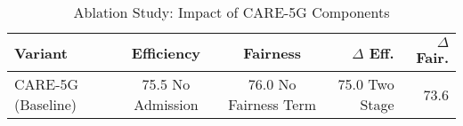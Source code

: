 \begin{table}[!t]\centering
\caption{Ablation Study: Impact of CARE-5G Components}
\begin{tabular}{lccrr}\toprule
Variant & Efficiency & Fairness & $\Delta$ Eff. & $\Delta$ Fair. \\
\midrule
CARE-5G (Baseline) & 75.5%
No Admission & 76.0%
No Fairness Term & 75.0%
Two Stage & 73.6%
\bottomrule\end{tabular}\end{table}
